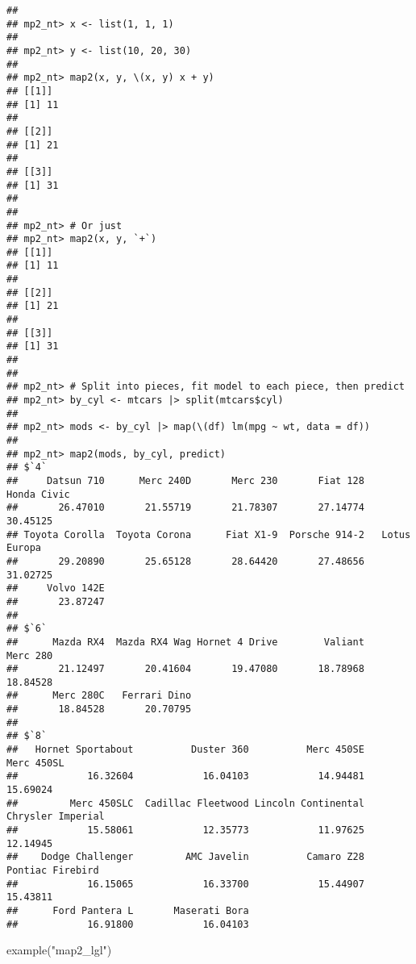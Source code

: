 \documentclass[
]{book}
\newenvironment{Shaded}{\begin{snugshade}}{\end{snugshade}}
\newcommand{\FunctionTok}[1]{\textcolor[rgb]{0.00,0.00,0.00}{#1}}
\newcommand{\NormalTok}[1]{#1}
\newcommand{\StringTok}[1]{\textcolor[rgb]{0.31,0.60,0.02}{#1}}
\begin{document}
\begin{verbatim}
## 
## mp2_nt> x <- list(1, 1, 1)
## 
## mp2_nt> y <- list(10, 20, 30)
## 
## mp2_nt> map2(x, y, \(x, y) x + y)
## [[1]]
## [1] 11
## 
## [[2]]
## [1] 21
## 
## [[3]]
## [1] 31
## 
## 
## mp2_nt> # Or just
## mp2_nt> map2(x, y, `+`)
## [[1]]
## [1] 11
## 
## [[2]]
## [1] 21
## 
## [[3]]
## [1] 31
## 
## 
## mp2_nt> # Split into pieces, fit model to each piece, then predict
## mp2_nt> by_cyl <- mtcars |> split(mtcars$cyl)
## 
## mp2_nt> mods <- by_cyl |> map(\(df) lm(mpg ~ wt, data = df))
## 
## mp2_nt> map2(mods, by_cyl, predict)
## $`4`
##     Datsun 710      Merc 240D       Merc 230       Fiat 128    Honda Civic 
##       26.47010       21.55719       21.78307       27.14774       30.45125 
## Toyota Corolla  Toyota Corona      Fiat X1-9  Porsche 914-2   Lotus Europa 
##       29.20890       25.65128       28.64420       27.48656       31.02725 
##     Volvo 142E 
##       23.87247 
## 
## $`6`
##      Mazda RX4  Mazda RX4 Wag Hornet 4 Drive        Valiant       Merc 280 
##       21.12497       20.41604       19.47080       18.78968       18.84528 
##      Merc 280C   Ferrari Dino 
##       18.84528       20.70795 
## 
## $`8`
##   Hornet Sportabout          Duster 360          Merc 450SE          Merc 450SL 
##            16.32604            16.04103            14.94481            15.69024 
##         Merc 450SLC  Cadillac Fleetwood Lincoln Continental   Chrysler Imperial 
##            15.58061            12.35773            11.97625            12.14945 
##    Dodge Challenger         AMC Javelin          Camaro Z28    Pontiac Firebird 
##            16.15065            16.33700            15.44907            15.43811 
##      Ford Pantera L       Maserati Bora 
##            16.91800            16.04103
\end{verbatim}

\begin{Shaded}
\begin{Highlighting}[]
\FunctionTok{example}\NormalTok{(}\StringTok{"map2\_lgl"}\NormalTok{)}
\end{Highlighting}
\end{Shaded}
\end{document}
